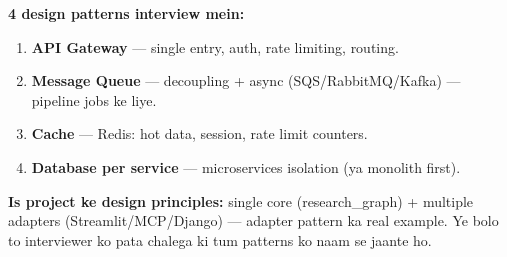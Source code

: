 \begin{conceptbox}
\textbf{4 design patterns interview mein:}
\begin{enumerate}[label=\arabic*.]
\item \textbf{API Gateway} --- single entry, auth, rate limiting, routing.
\item \textbf{Message Queue} --- decoupling + async (SQS/RabbitMQ/Kafka) --- pipeline jobs ke liye.
\item \textbf{Cache} --- Redis: hot data, session, rate limit counters.
\item \textbf{Database per service} --- microservices isolation (ya monolith first).
\end{enumerate}

\textbf{Is project ke design principles:} single core (research\_graph) + multiple adapters (Streamlit/MCP/Django) --- adapter pattern ka real example. Ye bolo to interviewer ko pata chalega ki tum patterns ko naam se jaante ho.
\end{conceptbox}
